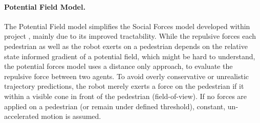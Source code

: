 \paragraph{Potential Field Model.} The Potential Field model simplifies the Social Forces model developed within project \project, mainly due to its improved tractability. While the repulsive forces each pedestrian as well as the robot exerts on a pedestrian depends on the relative state informed gradient of a potential field, which might be hard to understand, the potential forces model uses a distance only approach, to evaluate the repulsive force between two agents. To avoid overly conservative or unrealistic trajectory predictions, the robot merely exerts a force on the pedestrian if it within a visible cone in front of the pedestrian (field-of-view). If no forces are applied on a pedestrian (or remain under defined threshold), constant, un-accelerated motion is assumed.
